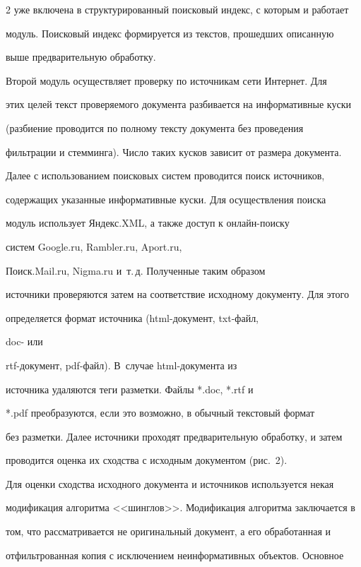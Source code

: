 \begin{multicols}{2}
уже включена в структурированный поисковый индекс, с которым и работает 

модуль. Поисковый индекс формируется из текстов, прошедших описанную 

выше предварительную обработку.

  

  Второй модуль осуществляет проверку по источникам сети Интернет. Для 

этих целей текст проверяемого документа разбивается на информативные куски 

(разбиение проводится по полному тексту документа без проведения 

фильтрации и стемминга). Число таких кусков зависит от размера документа. 

Далее с использованием поисковых сис\-тем проводится поиск источников, 

содержащих указанные информативные куски. Для осуществления поиска 

модуль использует Яндекс.XML, а также доступ к он\-лайн-поиску 

  сис\-тем {Google.ru}, {Rambler.ru}, {Aport.ru}, 

Поиск.Mail.ru, Nigma.ru и~т.\,д. Полученные таким образом 

источники проверяются затем на соответствие исходному документу. Для этого 

определяется формат источника (html-до\-ку\-мент, txt-файл, 

doc- или 

  rtf-до\-ку\-мент, pdf-файл). В~случае html-до\-ку\-мен\-та из 

источника удаляются теги разметки. Файлы *.doc, *.rtf и 

*.pdf преобразуются, если это возможно, в обычный текстовый формат 

без разметки. Далее источники проходят предварительную обработку, и затем 

проводится оценка их сходства с исходным документом (рис.~2). 



  

Для оценки сходства исходного документа и источ\-ни\-ков используется некая 

модификация ал\-горит\-ма <<шинглов>>. Модификация алгоритма заклю\-ча\-ет\-ся в 

том, что рассматривается не ори\-ги\-наль\-ный документ, а его обработанная и 

отфильтро\-ван\-ная копия с исключением неинформативных объектов. Основное 


\end{multicols}
